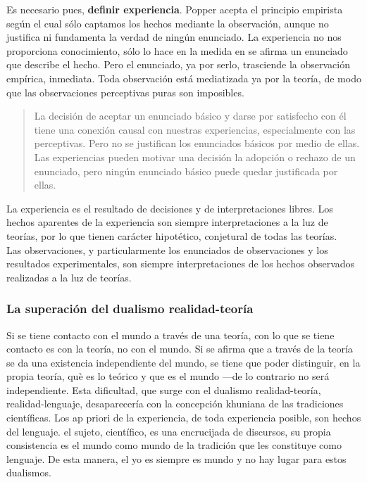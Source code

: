 \documentclass[a4paper, 11pt, twocolumn, spanish]{article}
\begin{document}
Es necesario pues, \textbf{definir experiencia}. Popper acepta el principio
empirista según el cual sólo captamos los hechos mediante la
observación, aunque no justifica ni fundamenta la verdad de ningún
enunciado. La experiencia no nos proporciona conocimiento, sólo lo
hace en la medida en se afirma un enunciado que describe el
hecho. Pero el enunciado, ya por serlo, trasciende la observación
empírica, inmediata. Toda observación está mediatizada ya por la
teoría, de modo que las observaciones perceptivas puras son
imposibles.\\[0pt]

\begin{quote}
La decisión de aceptar un enunciado básico y darse por satisfecho con
él tiene una conexión causal con nuestras experiencias, especialmente
con las perceptivas. Pero no se justifican los enunciados básicos por
medio de ellas. Las experiencias pueden motivar una decisión la
adopción o rechazo de un enunciado, pero ningún enunciado básico puede
quedar justificada por ellas.
\end{quote}

La experiencia es el resultado de decisiones y de interpretaciones
libres. Los hechos aparentes de la experiencia son siempre
interpretaciones a la luz de teorías, por lo que tienen carácter
hipotético, conjetural de todas las teorías.\\[0pt]
Las observaciones, y particularmente los enunciados de observaciones y
los resultados experimentales, son siempre interpretaciones de los
hechos observados realizadas a la luz de teorías.

\subsubsection{La superación del dualismo realidad-teoría}
\label{sec:orga29c0ed}
Si se tiene contacto con el mundo a través de una teoría, con lo que
se tiene contacto es con la teoría, no con el mundo. Si se afirma que
a través de la teoría se da una existencia independiente del mundo, se
tiene que poder distinguir, en la propia teoría, què es lo teórico y
que es el mundo —de lo contrario no será independiente. Esta
dificultad, que surge con el dualismo realidad-teoría,
realidad-lenguaje, desaparecería con la concepción khuniana de las
tradiciones científicas. Los ap priori de la experiencia, de toda
experiencia posible, son hechos del lenguaje. el sujeto, científico,
es una encrucijada de discursos, su propia consistencia es el mundo
como mundo de la tradición que les constituye como lenguaje. De esta
manera, el yo es siempre es mundo y no hay lugar para estos dualismos.
\end{document}
